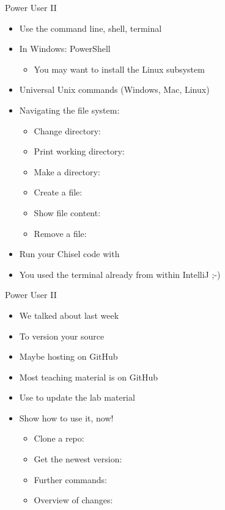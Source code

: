 \begin{frame}[fragile]{Power User II}
\begin{itemize}
\item Use the command line, shell, terminal
\item In Windows: PowerShell
\begin{itemize}
\item You may want to install the Linux subsystem
\end{itemize}
\item Universal Unix commands (Windows, Mac, Linux)
\item Navigating the file system:
\begin{itemize}
\item Change directory: 
\item Print working directory: 
\item Make a directory: 
\item Create a file: 
\item Show file content: 
\item Remove a file: 
\end{itemize}
\item Run your Chisel code with 
\item You used the terminal already from within IntelliJ ;-)
\end{itemize}
\end{frame}

\begin{frame}[fragile]{Power User II}
\begin{itemize}
\item We talked about  last week
\item To version your source
\item Maybe hosting on GitHub
\item Most teaching material is on GitHub
\item Use  to update the lab material
\item Show how to use it, now!
\begin{itemize}
\item Clone a repo: 
\item Get the newest version: 
\item Further commands: 
\item Overview of changes: 
\end{itemize}
\end{itemize}
\end{frame}


